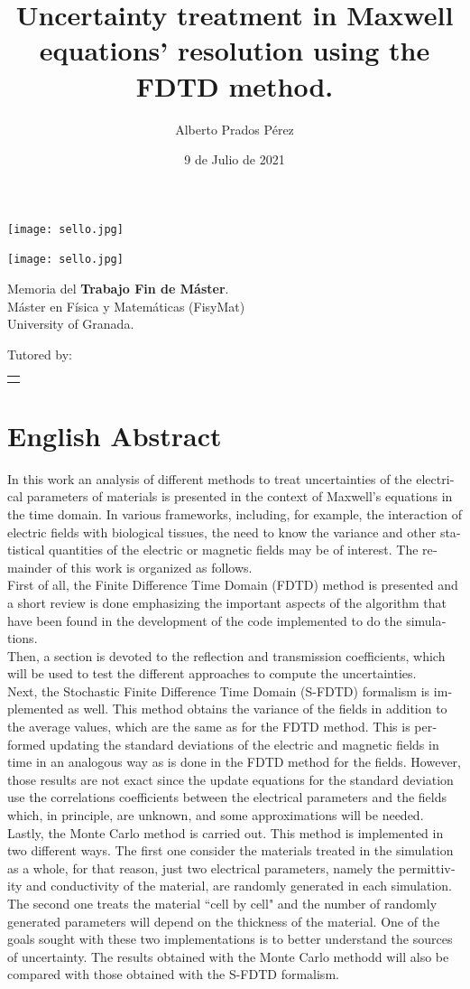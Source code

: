 \documentclass[12pt, oneside]{book}
\title{Uncertainty treatment in Maxwell equations' resolution using the FDTD method.}
\author{Alberto Prados Pérez}
\date{9 de Julio de 2021}
\makeatletter
\renewcommand\maketitle{%
  \begin{titlepage}
      \vspace*{1.5cm}
      \parskip=0pt
      \Huge\bfseries
      \begin{center}
          \leavevmode\texttt{[image: sello.jpg]}\\[2cm]
          \@title
      \end{center}
      \vspace{1cm}
      \begin{center}
          \@author
      \end{center}
      
  \end{titlepage}
  
  \begin{titlepage}
  \parindent=0pt
  \begin{flushleft}
  \vspace*{1.5mm}
  \setlength\baselineskip{0pt}
  \setlength\parskip{0mm}
  \begin{center}
      \leavevmode\texttt{[image: sello.jpg]}
  \end{center}
  \end{flushleft}
  \vspace{1cm}
  \bgroup
  \Large \bfseries
  \begin{center}
  \@title
  \end{center}
  \egroup
  \vspace*{.5cm}
  \begin{center}
  \@author
  \end{center}
  \vspace{0.5cm}
  \begin{center}
  \@date
  \end{center}
  \vspace*{1.8cm}
  \begin{flushright}
  \begin{minipage}{8.45cm}
      Memoria del {\bf Trabajo Fin de Máster}.\\ 
      Máster en Física y Matemáticas (FisyMat) \\ 
      University of Granada.

      \vspace*{7.5mm}

      Tutored by:
  \end{minipage}\par
  \begin{tabularx}{8.45cm}[b]{@{}l}
      \guardatutores
  \end{tabularx}
   \end{flushright}
      \vspace*{\fill}
   \end{titlepage}
   \pagestyle{tfg}
   \renewcommand{\chaptermark}[1]{\markright{\thechapter.\space ##1}}
   \renewcommand{\sectionmark}[1]{}
   \renewcommand{\subsectionmark}[1]{}
  }
\makeatother
\begin{document}
\maketitle

\frontmatter
\tableofcontents

\mainmatter

\chapter*{English Abstract}



\begin{otherlanguage}{english}
In this work an analysis of different methods to treat uncertainties of the electrical parameters of materials is presented in the context of Maxwell's equations in the time domain. In various frameworks, including, for example, the interaction of electric fields with biological tissues, the need to know the variance and other statistical quantities of the electric or magnetic fields may be of interest. The remainder of this work is organized as follows. \\
\indent First of all, the Finite Difference Time Domain (FDTD) method is presented and a short review is done emphasizing the important aspects of the algorithm that have been found in the development of the code implemented to do the simulations. \\
\indent Then, a section is devoted to the reflection and transmission coefficients, which will be used to test the different approaches to compute the uncertainties. \\
\indent Next, the Stochastic Finite Difference Time Domain (S-FDTD) formalism is implemented as well. This method obtains the variance of the fields in addition to the average values, which are the same as for the FDTD method. This is performed updating the standard deviations of the electric and magnetic fields in time in an analogous way as is done in the FDTD method for the fields. However, those results are not exact since the update equations for the standard deviation use the correlations coefficients between the electrical parameters and the fields which, in principle, are unknown, and some approximations will be needed. \\
\indent Lastly, the Monte Carlo method is carried out. This method is implemented in two different ways. The first one consider the materials treated in the simulation as a whole, for that reason, just two electrical parameters, namely the permittivity and conductivity of the material, are randomly generated in each simulation. The second one treats the material ``cell by cell" and the number of randomly generated parameters will depend on the thickness of the material.
One of the goals sought with these two implementations is to better understand the sources of uncertainty. The results obtained with the Monte Carlo methodd will also be compared with those obtained with the S-FDTD formalism. 
\end{otherlanguage}
\end{document}

